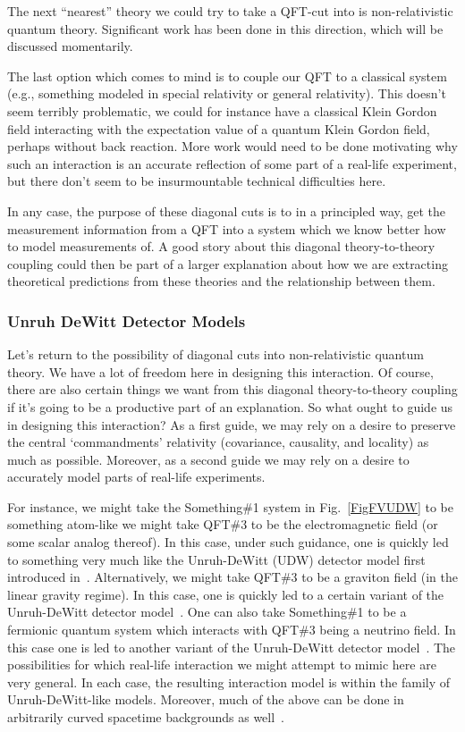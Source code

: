 \documentclass[prd,twocolumn,superscriptaddress,floatfix,amsmath,amssymb,amsfonts,nofootinbib]{revtex4-2}
\begin{document}
The next ``nearest'' theory we could try to take a QFT-cut into is non-relativistic quantum theory. Significant work has been done in this direction, which will be discussed momentarily.

The last option which comes to mind is to couple our QFT to a classical system (e.g., something modeled in special relativity or general relativity). This doesn't seem terribly problematic, we could for instance have a classical Klein Gordon field interacting with the expectation value of a quantum Klein Gordon field, perhaps without back reaction. More work would need to be done motivating why such an interaction is an accurate reflection of some part of a real-life experiment, but there don't seem to be insurmountable technical difficulties here.

In any case, the purpose of these diagonal cuts is to in a principled way, get the measurement information from a QFT into a system which we know better how to model measurements of. A good story about this diagonal theory-to-theory coupling could then be part of a larger explanation about how we are extracting theoretical predictions from these theories and the relationship between them. 

\subsubsection*{Unruh DeWitt Detector Models}
Let's return to the possibility of diagonal cuts into non-relativistic quantum theory. We have a lot of freedom here in designing this interaction. Of course, there are also certain things we want from this diagonal theory-to-theory coupling if it's going to be a productive part of an explanation. So what ought to guide us in designing this interaction? As a first guide, we may rely on a desire to preserve the central `commandments' relativity (covariance, causality, and locality) as much as possible. Moreover, as a second guide we may rely on a desire to accurately model parts of real-life experiments. 

For instance, we might take the Something\#1 system in Fig.~\ref{FigFVUDW} to be something atom-like we might take QFT\#3 to be the electromagnetic field (or some scalar analog thereof). In this case, under such guidance, one is quickly led~\cite{Pablo,RichardEdu,Richard} to something very much like the Unruh-DeWitt (UDW) detector model first introduced in~\cite{Unruh1976}.  Alternatively, we might take QFT\#3 to be a graviton field (in the linear gravity regime). In this case, one is quickly led to a certain variant of the Unruh-DeWitt detector model~\cite{GRQO,GravityDetector,GravityDetector2}. One can also take Something\#1 to be a fermionic quantum system which interacts with QFT\#3 being a neutrino field. In this case one is led to another variant of the Unruh-DeWitt detector model~\cite{MatsasNeutrinos, perche2021antiparticle}. The possibilities for which real-life interaction we might attempt to mimic here are very general. In each case, the resulting interaction model is within the family of Unruh-DeWitt-like models. Moreover, much of the above can be done in arbitrarily curved spacetime backgrounds as well~\cite{GRQO}.
\end{document}
